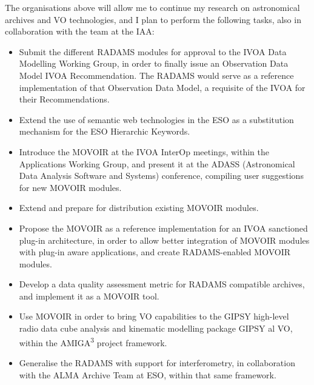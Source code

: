 		The organisations above will allow me to continue my
		research on astronomical archives and VO technologies,
		and I plan to perform the following tasks, also in
		collaboration with the team at the IAA:
		
		\begin{itemize}
			\item Submit the different RADAMS modules for approval
			to the IVOA Data Modelling Working Group, in order
			to finally issue an Observation Data Model IVOA
			Recommendation. The RADAMS would serve as a reference
			implementation of that Observation Data Model, a
			requisite of the IVOA for their Recommendations.
			
			\item Extend the use of semantic web technologies in
			the ESO as a substitution mechanism for the ESO
			Hierarchic Keywords.
			
			\item Introduce the MOVOIR at the IVOA InterOp meetings,
			within the Applications Working Group, and present it
			at the ADASS (Astronomical Data Analysis Software and
			Systems) conference, compiling user suggestions for
			new MOVOIR modules.
			
			\item Extend and prepare for distribution existing
			MOVOIR modules.
			
			\item Propose the MOVOIR as a reference implementation
			for an IVOA sanctioned plug-in architecture, in order
			to allow better integration of MOVOIR modules with
			plug-in aware applications, and create RADAMS-enabled
			MOVOIR modules.
			
			\item Develop a data quality assessment metric for
			RADAMS compatible archives, and implement it as a
			MOVOIR tool.
			
			\item Use MOVOIR in order to bring VO capabilities
			to the GIPSY high-level radio data cube analysis
			and kinematic modelling package GIPSY al VO, within
			the AMIGA\textsuperscript{3} project framework.
			
			\item Generalise the RADAMS with support for
			interferometry, in collaboration with the ALMA Archive
			Team at ESO, within that same framework.
		\end{itemize}
		
	

